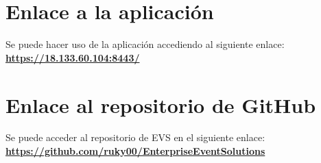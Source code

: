 \section{Enlace a la aplicación}
Se puede hacer uso de la aplicación accediendo al siguiente enlace: \textbf{\href{https://18.133.60.104:8443/}{https://18.133.60.104:8443/}}
\section{Enlace al repositorio de GitHub}
Se puede acceder al repositorio de EVS en el siguiente enlace: \textbf{\href{https://github.com/ruky00/EnterpriseEventSolutions}{https://github.com/ruky00/EnterpriseEventSolutions}}

